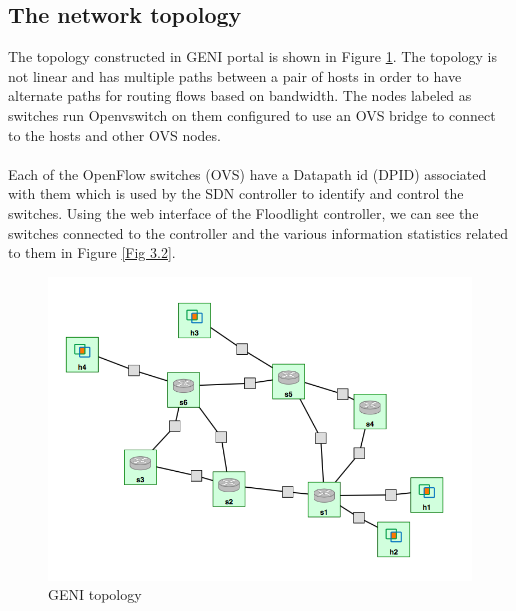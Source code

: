 \documentclass[paper=a4, fontsize=12pt]{scrartcl}	%
\numberwithin{equation}{section}		%
\numberwithin{figure}{section}			%
\numberwithin{table}{section}				%
\begin{document}
\subsection{The network topology}
The topology constructed in GENI portal is shown in Figure \ref{Fig 3.1}. The topology is not linear and has multiple paths between a pair of hosts in order to have alternate paths for routing flows based on bandwidth. The nodes labeled as switches run Openvswitch on them configured to use an OVS bridge to connect to the hosts and other OVS nodes.
\\
\\
Each of the OpenFlow switches (OVS) have a Datapath id (DPID) associated with them which is used by the SDN controller to identify and control the switches. Using the web interface of the Floodlight controller, we can see the switches connected to the controller and the various information statistics related to them in Figure \ref{Fig 3.2}.
\begin{figure}[H]
\begin{center}
\includegraphics[scale=0.4]{topology.png}   
\end{center}
 \caption{GENI topology}
 \label{Fig 3.1}
\end{figure}
\end{document}
